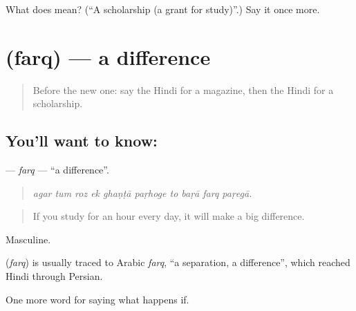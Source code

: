 \begin{tcolorbox}[breakable,colback=teal!4,colframe=teal!35!black,title={Before you move on}]
What does  mean? (\textquotedblleft{}A scholarship (a grant for study)\textquotedblright{}.) Say it once more.
\end{tcolorbox}
\section[\texorpdfstring{\hi{फ़र्क़} (farq)}{फ़र्क़ (farq)}]{ (farq) — a difference}

\label{lesson:HI-C397-farq}



\begin{quote}
Before the new one: say the Hindi for a magazine, then the Hindi for a scholarship.
\end{quote}

\subsection*{You'll want to know: }
\textbf{} — \emph{farq} — \textquotedblleft{}a difference\textquotedblright{}.

\begin{quote}
         
\end{quote}

\begin{quote}
\emph{agar tum roz ek ghaṇṭā paṛhoge to baṛā farq paṛegā.}
\end{quote}

\begin{quote}
If you study for an hour every day, it will make a big difference.
\end{quote}

Masculine.

\begin{cousinweb}
\textbf{} (\emph{farq}) is usually traced to Arabic \emph{farq}, \textquotedblleft{}a separation, a difference\textquotedblright{}, which reached Hindi through Persian.
\end{cousinweb}

\begin{grammarlens}[title={What you've built}]
One more word for saying what happens if.
\end{grammarlens}

